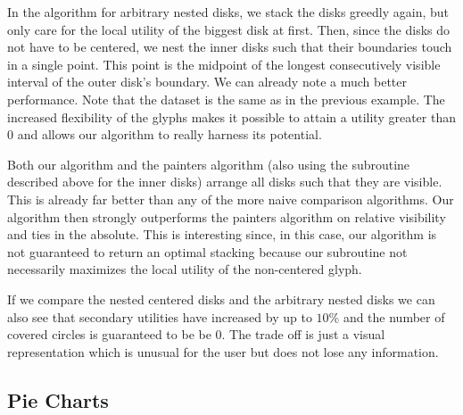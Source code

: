 \documentclass[a4paper,11pt]{article}
\begin{document}
In the algorithm for arbitrary nested disks, we stack the disks greedly again, but only care for the local utility of the biggest disk at first. Then, since the disks do not have to be centered, we nest the inner disks such that their boundaries touch in a single point. This point is the midpoint of the longest consecutively visible interval of the outer disk's boundary. We can already note a much better performance. Note that the dataset is the same as in the previous example. The increased flexibility of the glyphs makes it possible to attain a utility greater than $0$ and allows our algorithm to really harness its potential.

Both our algorithm and the painters algorithm (also using the subroutine described above for the inner disks) arrange all disks such that they are visible. This is already far better than any of the more naive comparison algorithms. Our algorithm then strongly outperforms the painters algorithm on relative visibility and ties in the absolute. This is interesting since, in this case, our algorithm is not guaranteed to return an optimal stacking because our subroutine not necessarily maximizes the local utility of the non-centered glyph.

If we compare the nested centered disks and the arbitrary nested disks we can also see that secondary utilities have increased by up to $10\%$ and the number of covered circles is guaranteed to be be $0$. The trade off is just a visual representation which is unusual for the user but does not lose any information.


\subsection*{Pie Charts}
\end{document}
